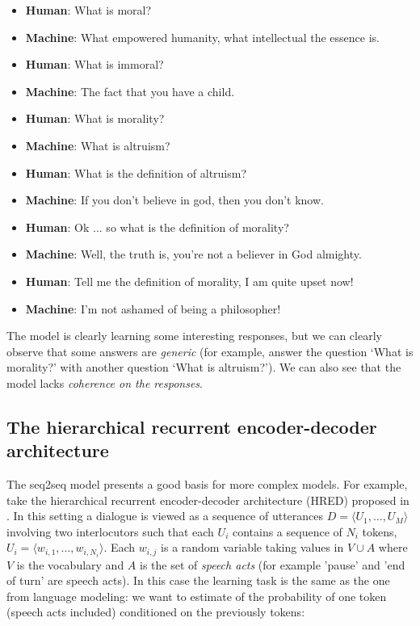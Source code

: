 \begin{itemize}
\item \textbf{Human}: What is moral?
\item \textbf{Machine}: What empowered humanity, what intellectual the essence is.
\item \textbf{Human}: What is immoral?
\item \textbf{Machine}: The fact that you have a child.
\item \textbf{Human}: What is morality?
\item \textbf{Machine}: What is altruism?
\item \textbf{Human}: What is the definition of altruism?
\item \textbf{Machine}: If you don’t believe in god, then you don’t know.
\item \textbf{Human}: Ok ... so what is the definition of morality?
\item \textbf{Machine}: Well, the truth is, you're not a believer in God almighty.
\item \textbf{Human}: Tell me the definition of morality, I am quite upset now!
\item \textbf{Machine}: I’m not ashamed of being a philosopher! 
\end{itemize}

The model is clearly learning some interesting responses, but we can clearly observe that some answers are \textit{generic} (for example, answer the question `What is morality?' with another question `What is altruism?'). We can also see that the model lacks \textit{coherence on the responses}.

\subsection{The hierarchical recurrent encoder-decoder architecture} 

The seq2seq model presents a good basis for more complex models. For example, take the hierarchical recurrent encoder-decoder architecture (HRED) proposed in \cite{Serban:2016a}. In this setting a dialogue is viewed as a sequence of utterances $D=\langle U_1 , \dots, U_M \rangle$ involving two interlocutors such that each $U_i$ contains a sequence of $N_i$ tokens, $U_i = \langle w_{i,1} , \dots, w_{i,N_{i}} \rangle$. Each $w_{i,j}$ is a random variable taking values in $V\cup A$ where $V$ is the vocabulary and $A$ is the set of \textit{speech acts} (for example 'pause' and 'end of turn' are  speech acts). In this case the learning task is the same as the one from language modeling: we want to estimate of the probability of one token (speech acts included) conditioned on the previously tokens:

